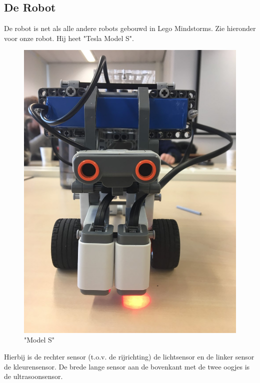 \documentclass[12pt]{article}
\begin{document}
	\subsection{De Robot}
		De robot is net als alle andere robots gebouwd in Lego Mindstorms. Zie hieronder voor onze robot. Hij heet "Tesla Model S".
		\begin{center}
			\begin{figure}
				\includegraphics[scale=0.3]{TeslaModelS}	
				\caption{"Model S"}
			\end{figure}
		\end{center}
		Hierbij is de rechter sensor (t.o.v. de rijrichting) de lichtsensor en de linker sensor de kleurensensor. De brede lange sensor aan de bovenkant met de twee oogjes is de ultrasoonsensor.
\end{document}
